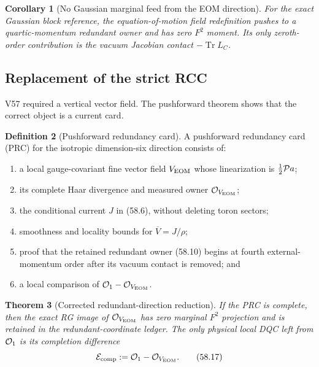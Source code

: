 \documentclass[11pt,oneside]{book}
\newtheorem{theorem}{Theorem}[chapter]
\newtheorem{corollary}[theorem]{Corollary}
\theoremstyle{definition}
\newtheorem{definition}[theorem]{Definition}
\theoremstyle{remark}
\newcommand{\Tr}{\operatorname{Tr}}
\begin{document}
\begin{corollary}[No Gaussian marginal feed from the EOM
direction]
\label{cor:e8v58-no-Gaussian-feed}
For the exact Gaussian block reference, the equation-of-motion
field redefinition pushes to a quartic-momentum redundant owner and
has zero \(F^2\) moment.  Its only zeroth-order contribution is the
vacuum Jacobian contact \(-\Tr L_C\).
\end{corollary}

\subsection{Replacement of the strict RCC}

V57 required a vertical vector field.  The pushforward theorem
shows that the correct object is a current card.

\begin{definition}[Pushforward redundancy card]
\label{def:e8v58-PRC}
A pushforward redundancy card (PRC) for the isotropic
dimension-six direction consists of:
\begin{enumerate}
\item a local gauge-covariant fine vector field \(V_{\rm EOM}\)
      whose linearization is \(\frac12{\cal P}a\);
\item its complete Haar divergence and measured owner
      \({\cal O}_{V_{\rm EOM}}\);
\item the conditional current \(J\) in (58.6), without deleting
      toron sectors;
\item smoothness and locality bounds for
      \(\overline V=J/\rho\);
\item proof that the retained redundant owner (58.10) begins at
      fourth external-momentum order after its vacuum contact is
      removed; and
\item a local comparison of
      \({\cal O}_1-{\cal O}_{V_{\rm EOM}}\).
\end{enumerate}
\end{definition}

\begin{theorem}[Corrected redundant-direction reduction]
\label{thm:e8v58-corrected-reduction}
If the PRC is complete, then the exact RG image of
\({\cal O}_{V_{\rm EOM}}\) has zero marginal \(F^2\) projection
and is retained in the redundant-coordinate ledger.  The only
physical local DQC left from \({\cal O}_1\) is its completion
difference
\[
 {\cal E}_{\rm comp}
 :={\cal O}_1-{\cal O}_{V_{\rm EOM}}.                         \tag{58.17}
\]
\end{theorem}
\end{document}
